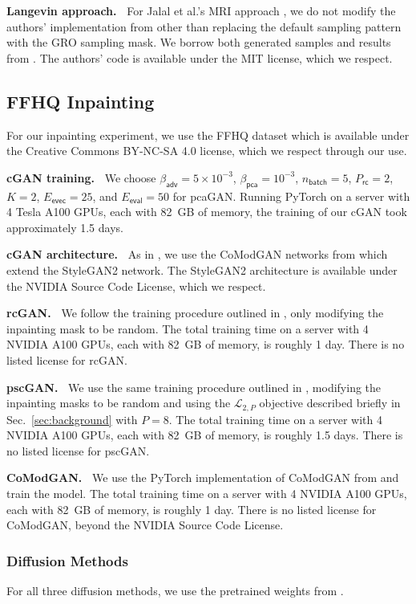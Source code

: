 \documentclass{article}
\theoremstyle{plain}
\theoremstyle{definition}
\theoremstyle{remark}
\newcommand{\secref}[1]{Sec.~\ref{sec:#1}}
\newcommand{\batch}{_{\mathsf{batch}}}
\newcommand{\train}{_{\mathsf{rc}}}
\newcommand{\eval}{_{\mathsf{eval}}}
\newcommand{\evec}{_{\mathsf{evec}}}
\newcommand{\betaadv}{\beta_{\mathsf{adv}}}
\newcommand{\betapca}{\beta_{\mathsf{pca}}}
\begin{document}
\textbf{Langevin approach.~} 
For Jalal et al.'s MRI approach \cite{Jalal:NIPS:21}, we do not modify the authors' implementation from \cite{Jalal:github:21} other than replacing the default sampling pattern with the GRO sampling mask. 
We borrow both generated samples and results from \cite{Bendel:NIPS:23}.
The authors' code is available under the MIT license, which we respect.

\subsection{FFHQ Inpainting} \label{app:inpainting}
For our inpainting experiment, we use the FFHQ dataset which is available under the Creative Commons BY-NC-SA 4.0 license, which we respect through our use.

\textbf{cGAN training.~} 
We choose $\betaadv = 5\times 10^{-3}$, $\betapca=10^{-3}$, $n\batch=5$, $P\train=2$, $K=2$, $E\evec=25$, and $E\eval=50$ for pcaGAN.
Running PyTorch on a server with 4 Tesla A100 GPUs, each with 82~GB of memory, the training of our cGAN took approximately 1.5 days.

\textbf{cGAN architecture.~}
As in \cite{Bendel:NIPS:23}, we use the CoModGAN networks from \cite{Zhao:ICLR:21} which extend the StyleGAN2 \cite{Karras:CVPR:20} network.
The StyleGAN2 architecture is available under the NVIDIA Source Code License, which we respect.

\textbf{rcGAN.~} 
We follow the training procedure outlined in \cite{Bendel:NIPS:23}, only modifying the inpainting mask to be random.
The total training time on a server with 4 NVIDIA A100 GPUs, each with 82~GB of memory, is roughly 1 day.
There is no listed license for rcGAN.

\textbf{pscGAN.~}
We use the same training procedure outlined in \cite{Bendel:NIPS:23}, modifying the inpainting masks to be random and using the $\mathcal{L}_{2,P}$ objective described briefly in \secref{background} with $P\!=\!8$.
The total training time on a server with 4 NVIDIA A100 GPUs, each with 82~GB of memory, is roughly 1.5 days.
There is no listed license for pscGAN.

\textbf{CoModGAN.~} 
We use the PyTorch implementation of CoModGAN from \cite{Zeng:github:22} and train the model. 
The total training time on a server with 4 NVIDIA A100 GPUs, each with 82~GB of memory, is roughly 1 day.
There is no listed license for CoModGAN, beyond the NVIDIA Source Code License.

\subsubsection{Diffusion Methods}
For all three diffusion methods, we use the pretrained weights from \cite{Chung:ICLR:23}.
\end{document}
